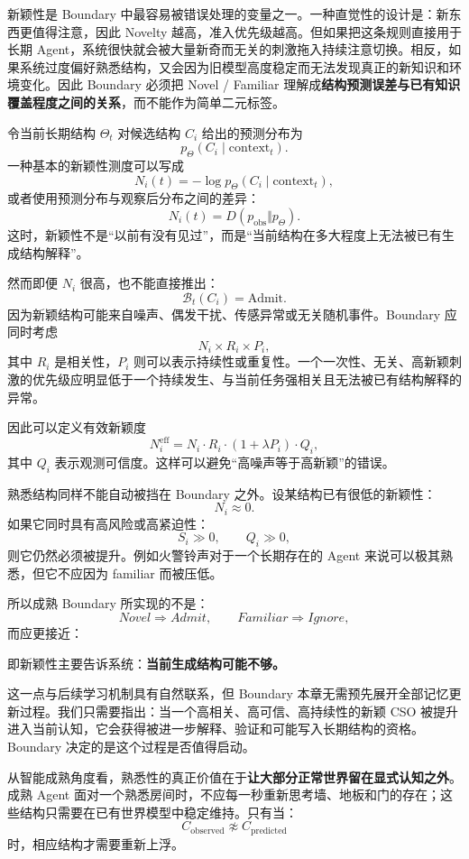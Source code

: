 新颖性是 Boundary 中最容易被错误处理的变量之一。一种直觉性的设计是：新东西更值得注意，因此 Novelty 越高，准入优先级越高。但如果把这条规则直接用于长期 Agent，系统很快就会被大量新奇而无关的刺激拖入持续注意切换。相反，如果系统过度偏好熟悉结构，又会因为旧模型高度稳定而无法发现真正的新知识和环境变化。因此 Boundary 必须把 Novel / Familiar 理解成\textbf{结构预测误差与已有知识覆盖程度之间的关系}，而不能作为简单二元标签。

令当前长期结构 $\Theta_t$ 对候选结构 $C_i$ 给出的预测分布为
\[
p_{\Theta}
\left(
C_i
\mid
\mathrm{context}_t
\right).
\]
一种基本的新颖性测度可以写成
\[
N_i(t)
=
-\log
p_{\Theta}
\left(
C_i
\mid
\mathrm{context}_t
\right),
\]
或者使用预测分布与观察后分布之间的差异：
\[
N_i(t)
=
D
\left(
p_{\mathrm{obs}}
\Vert
p_{\Theta}
\right).
\]
这时，新颖性不是“以前有没有见过”，而是“当前结构在多大程度上无法被已有生成结构解释”。

然而即便 $N_i$ 很高，也不能直接推出：
\[
\mathcal{B}_t(C_i)=\mathrm{Admit}.
\]
因为新颖结构可能来自噪声、偶发干扰、传感异常或无关随机事件。Boundary 应同时考虑
\[
N_i
\times
R_i
\times
P_i,
\]
其中 $R_i$ 是相关性，$P_i$ 则可以表示持续性或重复性。一个一次性、无关、高新颖刺激的优先级应明显低于一个持续发生、与当前任务强相关且无法被已有结构解释的异常。

因此可以定义有效新颖度
\[
N_i^{\mathrm{eff}}
=
N_i
\cdot
R_i
\cdot
\left(
1+\lambda P_i
\right)
\cdot
Q_i,
\]
其中 $Q_i$ 表示观测可信度。这样可以避免“高噪声等于高新颖”的错误。

熟悉结构同样不能自动被挡在 Boundary 之外。设某结构已有很低的新颖性：
\[
N_i\approx0.
\]
如果它同时具有高风险或高紧迫性：
\[
S_i\gg0,
\qquad
Q_i\gg0,
\]
则它仍然必须被提升。例如火警铃声对于一个长期存在的 Agent 来说可以极其熟悉，但它不应因为 familiar 而被压低。

所以成熟 Boundary 所实现的不是：
\[
Novel\Rightarrow Admit,\qquad
Familiar\Rightarrow Ignore,
\]
而应更接近：
\begin{statementbox}
\centering
{}
\end{statementbox}
即新颖性主要告诉系统：\textbf{当前生成结构可能不够。}

这一点与后续学习机制具有自然联系，但 Boundary 本章无需预先展开全部记忆更新过程。我们只需要指出：当一个高相关、高可信、高持续性的新颖 CSO 被提升进入当前认知，它会获得被进一步解释、验证和可能写入长期结构的资格。Boundary 决定的是这个过程是否值得启动。

从智能成熟角度看，熟悉性的真正价值在于\textbf{让大部分正常世界留在显式认知之外}。成熟 Agent 面对一个熟悉房间时，不应每一秒重新思考墙、地板和门的存在；这些结构只需要在已有世界模型中稳定维持。只有当：
\[
C_{\mathrm{observed}}
\not\approx
C_{\mathrm{predicted}}
\]
时，相应结构才需要重新上浮。

